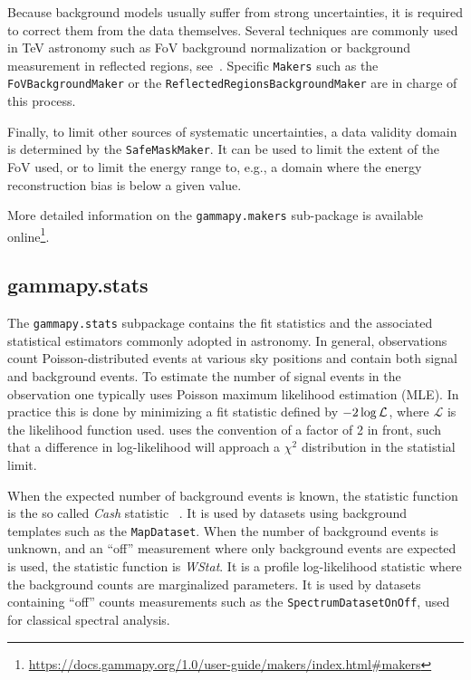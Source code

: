 \documentclass[longauth]{aa}
\newcommand{\code}[1]{\texttt{#1}}
\begin{document}
Because background models usually suffer from strong uncertainties, it is required
to correct them from the data themselves. Several techniques are commonly used
in TeV \gammaray astronomy such as FoV background normalization or
background measurement in reflected regions, see~\cite{Berge07}.
Specific \code{Makers} such as the \code{FoVBackgroundMaker} or the
\code{ReflectedRegionsBackgroundMaker} are in charge of this process.

Finally, to limit other sources of systematic uncertainties, a data validity
domain is determined by the \code{SafeMaskMaker}. It can be used to limit the
extent of the FoV used, or to limit the energy range to, e.g., a domain
where the energy reconstruction bias is below a given value.

More detailed information on the \code{gammapy.makers} sub-package is available online\footnote{\url{https://docs.gammapy.org/1.0/user-guide/makers/index.html\#makers}}.


\subsection{gammapy.stats}
\label{ssec:gammapy-stats}
The \code{gammapy.stats} subpackage contains the fit statistics and the associated
statistical estimators commonly adopted in \gammaray astronomy. In
general, \gammaray observations count Poisson-distributed events at various sky
positions and contain both signal and background events.
To estimate the number of signal events in the observation one typically uses
Poisson maximum likelihood estimation (MLE). In practice this is done
by minimizing a fit statistic defined by $-2 \time\cdot \log{\mathcal{L}}$,
where $\mathcal{L}$ is the likelihood function used. \gammapy uses the convention
of a factor of 2 in front, such that a difference in log-likelihood will
approach a $\chi^2$ distribution in the statistial limit.

When the expected number of background events is known, the statistic function 
is the so called \emph{Cash} statistic ~\citep{Cash}. It is used by datasets using background
templates such as the
\code{MapDataset}. When the number of background events is unknown, and an \enquote{off}
measurement where only background events are expected is used, the statistic
function is \emph{WStat}. It is a profile log-likelihood statistic where the background
counts are marginalized parameters. It is used by datasets containing \enquote{off}
counts measurements such as the \code{SpectrumDatasetOnOff}, used for classical
spectral analysis.
\end{document}
